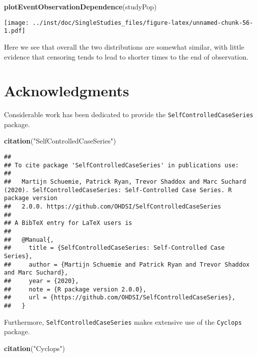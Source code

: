 \documentclass[
]{article}
\newenvironment{Shaded}{\begin{snugshade}}{\end{snugshade}}
\newcommand{\KeywordTok}[1]{\textcolor[rgb]{0.13,0.29,0.53}{\textbf{#1}}}
\newcommand{\NormalTok}[1]{#1}
\newcommand{\StringTok}[1]{\textcolor[rgb]{0.31,0.60,0.02}{#1}}
\begin{document}
\begin{Shaded}
\begin{Highlighting}[]
\KeywordTok{plotEventObservationDependence}\NormalTok{(studyPop)}
\end{Highlighting}
\end{Shaded}

\texttt{[image: ../inst/doc/SingleStudies\_files/figure-latex/unnamed-chunk-56-1.pdf]}

Here we see that overall the two distributions are somewhat similar,
with little evidence that censoring tends to lead to shorter times to
the end of observation.

\hypertarget{acknowledgments}{%
\section{Acknowledgments}\label{acknowledgments}}

Considerable work has been dedicated to provide the
\texttt{SelfControlledCaseSeries} package.

\begin{Shaded}
\begin{Highlighting}[]
\KeywordTok{citation}\NormalTok{(}\StringTok{"SelfControlledCaseSeries"}\NormalTok{)}
\end{Highlighting}
\end{Shaded}

\begin{verbatim}
## 
## To cite package 'SelfControlledCaseSeries' in publications use:
## 
##   Martijn Schuemie, Patrick Ryan, Trevor Shaddox and Marc Suchard (2020). SelfControlledCaseSeries: Self-Controlled Case Series. R package version
##   2.0.0. https://github.com/OHDSI/SelfControlledCaseSeries
## 
## A BibTeX entry for LaTeX users is
## 
##   @Manual{,
##     title = {SelfControlledCaseSeries: Self-Controlled Case Series},
##     author = {Martijn Schuemie and Patrick Ryan and Trevor Shaddox and Marc Suchard},
##     year = {2020},
##     note = {R package version 2.0.0},
##     url = {https://github.com/OHDSI/SelfControlledCaseSeries},
##   }
\end{verbatim}

Furthermore, \texttt{SelfControlledCaseSeries} makes extensive use of
the \texttt{Cyclops} package.

\begin{Shaded}
\begin{Highlighting}[]
\KeywordTok{citation}\NormalTok{(}\StringTok{"Cyclops"}\NormalTok{)}
\end{Highlighting}
\end{Shaded}
\end{document}
